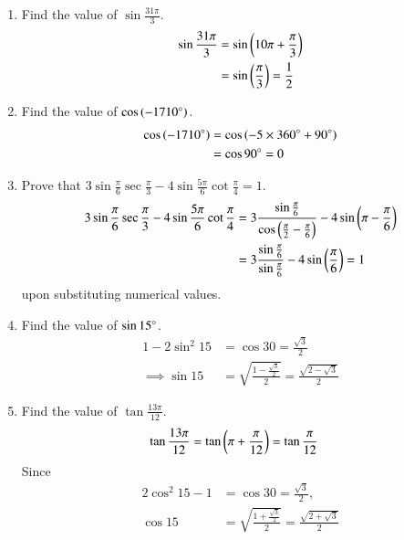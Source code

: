 \begin{enumerate}[label=\thesubsection.\arabic*,ref=\thesubsection.\theenumi,itemsep=1ex]
\begin{figure}[H]
\begin{center}
	\end{center}
	\caption{}
	\label{fig:ncert-id-2}	
\end{figure}
\item Find the value of $\sin \frac{31\pi}{3}$.
%
	\\
		\solution 
\begin{align}
	\sin \frac{31\pi}{3} &= 
	\sin \left(10 \pi+\frac{\pi}{3}\right) 
	\\
	&= 
	\sin \left(\frac{\pi}{3}\right) = \frac{1}{2}
\end{align}
\item Find the value of $\cos\left(-1710\degree\right)$.
%
	\\
		\solution 
\begin{align}
	\cos\left(-1710\degree\right)	&= 
\cos\left(-5\times360\degree+90\degree\right)	 
\\
	&=\cos{90\degree}	= 0
\end{align}
\item Prove that $3\sin\frac{\pi}{6}\sec\frac{\pi}{3}-4\sin\frac{5\pi}{6}\cot\frac{\pi}{4} = 1.$
%
	\\
	\solution
\begin{align}
	3\sin\frac{\pi}{6}\sec\frac{\pi}{3}-4\sin\frac{5\pi}{6}\cot\frac{\pi}{4} &= 
	3\frac{\sin\frac{\pi}{6}}{\cos\left(\frac{\pi}{2}-\frac{\pi}{6}\right)}-4\sin\left(\pi - \frac{\pi}{6}\right)  
	\\
	&=
	3\frac{\sin\frac{\pi}{6}}{\sin\frac{\pi}{6}}-4\sin\left( \frac{\pi}{6}\right)  
	= 1
\end{align}
upon substituting numerical values.
\item Find the value of $\sin 15\degree$.
%
	\\
	\solution 
\begin{align}
	1 - 2 \sin^2 15 &= \cos 30 = \frac{\sqrt{3}}{2}
	\\
	\implies 
	\sin 15 &= \sqrt{\frac{1-\frac{\sqrt{3}}{2}}{2}}
	 = \frac{\sqrt{2-\sqrt{3}}}{2}
	 \label{eq:id-sin15}
\end{align}
\item Find the value of $\tan\frac{13\pi}{12}$.
%
	\\
	\solution 
\begin{align}
\tan\frac{13\pi}{12}
	&=
	\tan\left(\pi+\frac{\pi}{12}\right)
=\tan\frac{\pi}{12}
\end{align}
%
Since
\begin{align}
	2 \cos^2 15 -1 &= \cos 30 = \frac{\sqrt{3}}{2},
	\\
	\cos15 &= \sqrt{\frac{1+\frac{\sqrt{3}}{2}}{2}}
	 = \frac{\sqrt{2+\sqrt{3}}}{2}

\end{align}
\end{enumerate}
